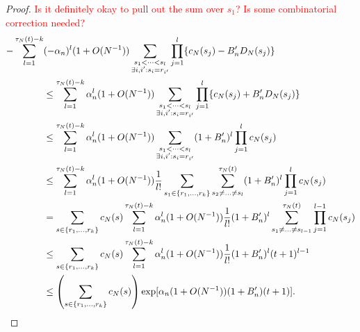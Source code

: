 \documentclass{article}
\newcommand{\seb}[1]{\xspace\textcolor{red}{#1}\xspace}
\newcommand{\1}[1]{\mathbbm{1}_{#1}}
\begin{document}
\begin{proof}
\seb{Is it definitely okay to pull out the sum over $s_1$? Is some combinatorial correction needed?}
\begin{align}
- \sum_{l=1}^{\tau_N(t) -k} &(-\alpha_n)^l (1+O(N^{-1}))
\sum_{\substack{s_1<\dots<s_l \\ \exists i,i^\prime : s_i=r_{i^\prime} }}
\prod_{j=1}^l \{ c_N(s_j) - B_n^\prime D_N(s_j) \} \notag\\
&\leq \sum_{l=1}^{\tau_N(t) -k} \alpha_n^l (1+O(N^{-1}))
\sum_{\substack{s_1<\dots<s_l \\ \exists i,i^\prime : s_i=r_{i^\prime} }}
\prod_{j=1}^l \{ c_N(s_j) + B_n^\prime D_N(s_j) \} \notag\\
&\leq \sum_{l=1}^{\tau_N(t) -k} \alpha_n^l (1+O(N^{-1}))
\sum_{\substack{s_1<\dots<s_l \\ \exists i,i^\prime : s_i=r_{i^\prime} }}
(1 + B_n^\prime)^l \prod_{j=1}^l c_N(s_j) \notag\\
&\leq \sum_{l=1}^{\tau_N(t) -k} \alpha_n^l (1+O(N^{-1}))
\frac{1}{l!} \sum_{s_1 \in \{r_1,\dots,r_k\} } \sum_{s_2\neq \dots\neq s_l}^{\tau_N(t)}
(1 + B_n^\prime)^l \prod_{j=1}^l c_N(s_j) \notag\\
&= \sum_{s \in \{r_1,\dots,r_k\} } c_N(s)
\sum_{l=1}^{\tau_N(t) -k} \alpha_n^l (1+O(N^{-1}))
\frac{1}{l!}  (1 + B_n^\prime)^l
\sum_{s_1\neq \dots\neq s_{l-1}}^{\tau_N(t)} 
\prod_{j=1}^{l-1} c_N(s_j) \notag\\
&\leq \sum_{s \in \{r_1,\dots,r_k\} } c_N(s)
\sum_{l=1}^{\tau_N(t) -k} \alpha_n^l (1+O(N^{-1}))
\frac{1}{l!}  (1 + B_n^\prime)^l (t+1)^{l-1} \notag\\
&\leq \left( \sum_{s \in \{r_1,\dots,r_k\} } c_N(s) \right)
\exp[ \alpha_n (1+O(N^{-1})) (1 + B_n^\prime) (t+1) ] .
\end{align}

\end{proof}
\end{document}
